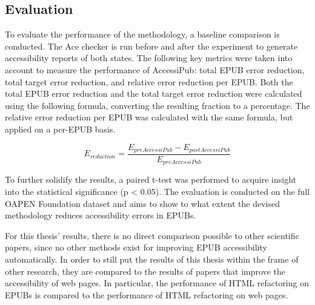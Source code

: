 \subsection{Evaluation}
To evaluate the performance of the methodology, a baseline comparison is conducted. The Ace checker is run before and after the experiment to generate accessibility reports of both states. The following key metrics were taken into account to measure the performance of AccessiPub: total EPUB error reduction, total target error reduction, and relative error reduction per EPUB.
Both the total EPUB error reduction and the total target error reduction were calculated using the following formula, converting the resulting fraction to a percentage. The relative error reduction per EPUB was calculated with the same formula, but applied on a per-EPUB basis.

\[E_{reduction} = \frac{E_{pre AccessiPub} - E_{post AccessiPub}}{E_{pre AccessiPub}}\]


To further solidify the results, a paired t-test was performed to acquire insight into the statistical significance (p < 0.05). The evaluation is conducted on the full OAPEN Foundation dataset and aims to show to what extent the devised methodology reduces accessibility errors in EPUBs.

For this thesis' results, there is no direct comparison possible to other scientific papers, since no other methods exist for improving EPUB accessibility automatically. In order to still put the results of this thesis within the frame of other research, they are compared to the results of papers that improve the accessibility of web pages. In particular, the performance of HTML refactoring on EPUBs is compared to the performance of HTML refactoring on web pages.